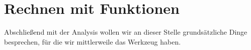 \section{Rechnen mit Funktionen}
	Abschließend mit der Analysis wollen wir an dieser Stelle grundsätzliche Dinge
	besprechen, für die wir mittlerweile das Werkzeug haben.

	

	
